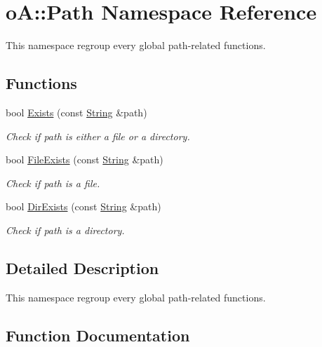 \hypertarget{namespaceo_a_1_1_path}{}\section{oA\+:\+:Path Namespace Reference}
\label{namespaceo_a_1_1_path}


This namespace regroup every global path-\/related functions.  


\subsection*{Functions}
\begin{DoxyCompactItemize}
\item 
bool \mbox{\hyperlink{namespaceo_a_1_1_path_a761a94ba9a50cc164837c4dc4b4c78ae}{Exists}} (const \mbox{\hyperlink{classo_a_1_1_string}{String}} \&path)
\begin{DoxyCompactList}\small\item\em Check if path is either a file or a directory. \end{DoxyCompactList}\item 
bool \mbox{\hyperlink{namespaceo_a_1_1_path_af332d947cbb51cf1141c0718169748c3}{File\+Exists}} (const \mbox{\hyperlink{classo_a_1_1_string}{String}} \&path)
\begin{DoxyCompactList}\small\item\em Check if path is a file. \end{DoxyCompactList}\item 
bool \mbox{\hyperlink{namespaceo_a_1_1_path_ae8828b311b87426010a6b60192ebf78e}{Dir\+Exists}} (const \mbox{\hyperlink{classo_a_1_1_string}{String}} \&path)
\begin{DoxyCompactList}\small\item\em Check if path is a directory. \end{DoxyCompactList}\end{DoxyCompactItemize}


\subsection{Detailed Description}
This namespace regroup every global path-\/related functions. 

\subsection{Function Documentation}
\mbox{\label{namespaceo_a_1_1_path_ae8828b311b87426010a6b60192ebf78e}} 

